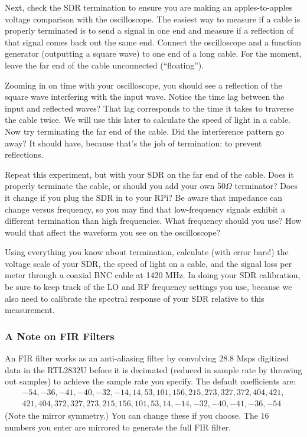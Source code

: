\documentclass[11pt,preprint]{aastex}
\begin{document}
Next, check the SDR termination to
ensure you are making an apples-to-apples voltage comparison with the
oscilloscope. The easiest way to measure if a cable is properly terminated
is to send a signal in one end and measure if a reflection of that signal
comes back out the same end. Connect
the oscilloscope and a function generator (outputting a square wave) 
to one end of a long cable. For the moment, leave the far end of the cable
unconnected (``floating'').

Zooming in on time with your oscilloscope, you should see a reflection of the square wave
interfering with the input wave. Notice the time lag between the input and
reflected waves? That lag corresponds to the time it takes to traverse
the cable twice. We will use this later to calculate the speed of light
in a cable.
Now try terminating the far end of the cable. Did the interference pattern
go away? It should have, because that's the job of termination: to prevent
reflections.

Repeat this experiment, but with your SDR on the far end
of the cable. Does it properly terminate the cable, or should you
add your own 50$\Omega$ terminator? Does it change if you plug the SDR
in to your RPi? Be aware that impedance can change versus frequency,
so you may find that low-frequency signals exhibit a different termination
than high frequencies. What frequency should you use? How would that affect the waveform you see
on the oscilloscope?

Using everything you know about termination, calculate (with error bars!)
the voltage scale of your SDR, the speed of light on a cable, and the
signal loss per meter through a coaxial BNC cable at 1420 MHz.
In doing your SDR calibration, be sure to keep track of the LO and RF
frequency settings you use, because we also need to calibrate
the spectral response of your SDR relative to this measurement.

\subsubsection{A Note on FIR Filters}

An FIR filter works as an anti-aliasing filter by convolving
28.8 Msps digitized data in the RTL2832U before it is decimated (reduced
in sample rate by throwing out samples) to achieve the sample rate you
specify.
The default coefficients are:
$$
\begin{aligned}
   -54,-36,-41,-40,-32,-14, 14, 53, 101, 156, 215, 273, 327, 372, 404, 421, \\
   421,404,372, 327,273,215,156,101, 53, 14, -14, -32, -40, -41, -36, -54
\end{aligned}
$$ 
(Note the mirror symmetry.) You can change these if you choose.
The 16 numbers you enter are mirrored to generate the full FIR filter.
\end{document}
